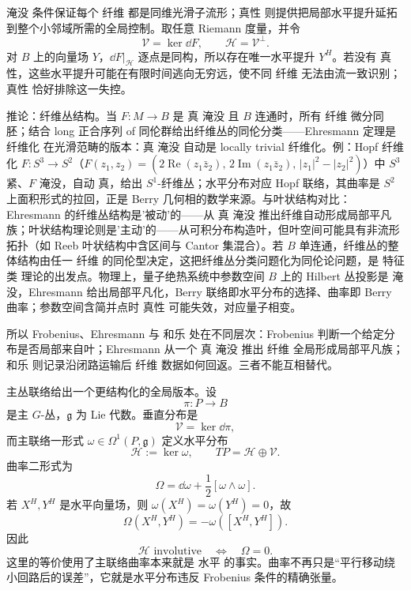 淹没 条件保证每个 纤维 都是同维光滑子流形；真性 则提供把局部水平提升延拓到整个小邻域所需的全局控制。取任意 Riemann 度量，并令
\[
\mathcal V=\ker\dd F,
\qquad
\mathcal H=\mathcal V^\perp.
\]
对 $B$ 上的向量场 $Y$，$\dd F|_{\mathcal H}$ 逐点是同构，所以存在唯一水平提升 $Y^H$。若没有 真性，这些水平提升可能在有限时间逃向无穷远，使不同 纤维 无法由流一致识别；真性 恰好排除这一失控。

推论：纤维丛结构。当 $F:M\to B$ 是 真 淹没 且 $B$ 连通时，所有 纤维 微分同胚；结合 long 正合序列 of 同伦群给出纤维丛的同伦分类——Ehresmann 定理是 纤维化 在光滑范畴的版本：真 淹没 自动是 locally trivial 纤维化。例：Hopf 纤维化 $F:S^3\to S^2$（$F(z_1,z_2)=(2\operatorname{Re}(z_1\bar z_2),\,2\operatorname{Im}(z_1\bar z_2),\,|z_1|^2-|z_2|^2)$）中 $S^3$ 紧、$F$ 淹没，自动 真，给出 $S^1$-纤维丛；水平分布对应 Hopf 联络，其曲率是 $S^2$ 上面积形式的拉回，正是 Berry 几何相的数学来源。与叶状结构对比：Ehresmann 的纤维丛结构是'被动'的——从 真 淹没 推出纤维自动形成局部平凡族；叶状结构理论则是'主动'的——从可积分布构造叶，但叶空间可能具有非流形拓扑（如 Reeb 叶状结构中含区间与 Cantor 集混合）。若 $B$ 单连通，纤维丛的整体结构由任一 纤维 的同伦型决定，这把纤维丛分类问题化为同伦论问题，是 特征类 理论的出发点。物理上，量子绝热系统中参数空间 $B$ 上的 Hilbert 丛投影是 淹没，Ehresmann 给出局部平凡化，Berry 联络即水平分布的选择、曲率即 Berry 曲率；参数空间含简并点时 真性 可能失效，对应量子相变。

所以 Frobenius、Ehresmann 与 和乐 处在不同层次：Frobenius 判断一个给定分布是否局部来自叶；Ehresmann 从一个 真 淹没 推出 纤维 全局形成局部平凡族；和乐 则记录沿闭路运输后 纤维 数据如何回返。三者不能互相替代。

主丛联络给出一个更结构化的全局版本。设
\[
 \pi:P\to B
\]
是主 $G$-丛，$\mathfrak g$ 为 Lie 代数。垂直分布是
\[
 \mathcal V=\ker\dd\pi,
\]
而主联络一形式 $\omega\in\Omega^1(P,\mathfrak g)$ 定义水平分布
\begin{equation*}\mathcal H:=\ker\omega,
 \qquad
 TP=\mathcal H\oplus\mathcal V.
\end{equation*}
曲率二形式为
\begin{equation*}\Omega
 =\dd\omega+\frac12[\omega\wedge\omega].
\end{equation*}
若 $X^H,Y^H$ 是水平向量场，则 $\omega(X^H)=\omega(Y^H)=0$，故
\begin{equation}\label{eq:math-dg-curvature-nonintegrability}
 \boxed{
 \Omega(X^H,Y^H)
 =-\omega([X^H,Y^H]).}
\end{equation}
因此
\begin{equation}\label{eq:math-dg-horizontal-frobenius}
 \boxed{
 \mathcal H\text{ involutive}
 \quad\Longleftrightarrow\quad
 \Omega=0.}
\end{equation}
这里的等价使用了主联络曲率本来就是 水平 的事实。曲率不再只是“平行移动绕小回路后的误差”，它就是水平分布违反 Frobenius 条件的精确张量。

